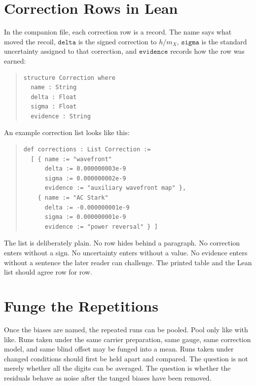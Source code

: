 \section{Correction Rows in Lean}

In the companion file, each correction row is a record. The name says what moved the recoil, \(\texttt{delta}\)
is the signed correction to \(h/m_X\), \(\texttt{sigma}\) is the standard uncertainty assigned to that correction,
and \(\texttt{evidence}\) records how the row was earned:

\begin{quote}\small
\begin{verbatim}
structure Correction where
  name : String
  delta : Float
  sigma : Float
  evidence : String
\end{verbatim}
\end{quote}

An example correction list looks like this:

\begin{quote}\small
\begin{verbatim}
def corrections : List Correction :=
  [ { name := "wavefront"
      delta := 0.000000003e-9
      sigma := 0.000000002e-9
      evidence := "auxiliary wavefront map" },
    { name := "AC Stark"
      delta := -0.000000001e-9
      sigma := 0.000000001e-9
      evidence := "power reversal" } ]
\end{verbatim}
\end{quote}

The list is deliberately plain. No row hides behind a paragraph. No correction enters without a sign. No
uncertainty enters without a value. No evidence enters without a sentence the later reader can challenge. The
printed table and the Lean list should agree row for row.

\section{Funge the Repetitions}

Once the biases are named, the repeated runs can be pooled. Pool only like with like. Runs taken under the same
carrier preparation, same gauge, same correction model, and same blind offset may be funged into a mean. Runs
taken under changed conditions should first be held apart and compared. The question is not merely whether all
the digits can be averaged. The question is whether the residuals behave as noise after the tanged biases have
been removed.

